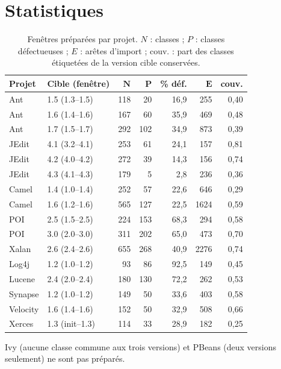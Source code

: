\documentclass[11pt,a4paper,openany]{report}
\begin{document}
\section{Statistiques}
\begin{table}[htbp]
\centering\small
\caption{Fenêtres préparées par projet. $N$ : classes ; $P$ : classes défectueuses ; $E$ : arêtes d'import ;
couv. : part des classes étiquetées de la version cible conservées.}
\label{tab:data}
\begin{tabular}{llrrrrr}
\toprule
\textbf{Projet} & \textbf{Cible (fenêtre)} & $\boldsymbol{N}$ & $\boldsymbol{P}$ & \textbf{\% déf.} & $\boldsymbol{E}$ & \textbf{couv.} \\
\midrule
Ant      & 1.5 (1.3--1.5) & 118 & 20  & 16,9 & 255  & 0,40 \\
Ant      & 1.6 (1.4--1.6) & 167 & 60  & 35,9 & 469  & 0,48 \\
Ant      & 1.7 (1.5--1.7) & 292 & 102 & 34,9 & 873  & 0,39 \\
JEdit    & 4.1 (3.2--4.1) & 253 & 61  & 24,1 & 157  & 0,81 \\
JEdit    & 4.2 (4.0--4.2) & 272 & 39  & 14,3 & 156  & 0,74 \\
JEdit    & 4.3 (4.1--4.3) & 179 & 5   & 2,8  & 236  & 0,36 \\
Camel    & 1.4 (1.0--1.4) & 252 & 57  & 22,6 & 646  & 0,29 \\
Camel    & 1.6 (1.2--1.6) & 565 & 127 & 22,5 & 1624 & 0,59 \\
POI      & 2.5 (1.5--2.5) & 224 & 153 & 68,3 & 294  & 0,58 \\
POI      & 3.0 (2.0--3.0) & 311 & 202 & 65,0 & 473  & 0,70 \\
Xalan    & 2.6 (2.4--2.6) & 655 & 268 & 40,9 & 2276 & 0,74 \\
Log4j    & 1.2 (1.0--1.2) & 93  & 86  & 92,5 & 149  & 0,45 \\
Lucene   & 2.4 (2.0--2.4) & 180 & 130 & 72,2 & 262  & 0,53 \\
Synapse  & 1.2 (1.0--1.2) & 149 & 50  & 33,6 & 403  & 0,58 \\
Velocity & 1.6 (1.4--1.6) & 152 & 50  & 32,9 & 508  & 0,66 \\
Xerces   & 1.3 (init--1.3)& 114 & 33  & 28,9 & 182  & 0,25 \\
\bottomrule
\end{tabular}
\end{table}

Ivy (aucune classe commune aux trois versions) et PBeans (deux versions seulement) ne sont pas préparés.
\end{document}
